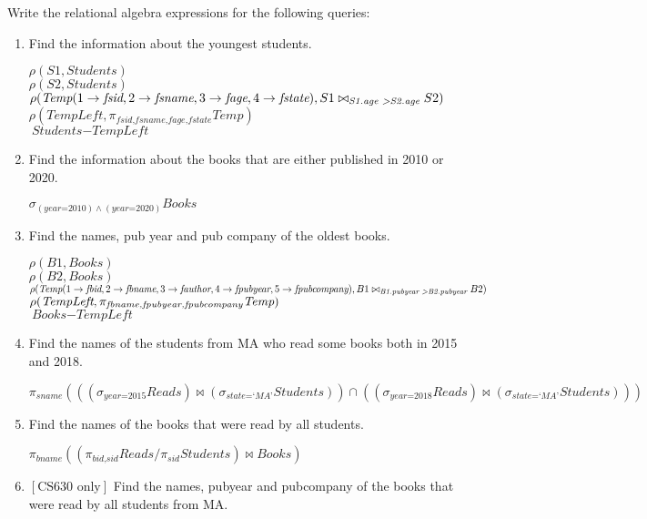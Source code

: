 \documentclass[letterpaper, 11pt]{article}
\begin{document}
Write the relational algebra expressions for the following queries:
\begin{enumerate}[label={\alph*})]
    \item Find the information about the youngest students.
    
    $\rho(S1, \textit{Students})$\\
    $\rho(S2, \textit{Students})$\\
    $\rho(\textit{Temp}(1 \to \textit{fsid}, 2 \to \textit{fsname}, 3 \to \textit{fage}, 4 \to \textit{fstate}), S1 \bowtie_{\textit{S1.age \textgreater S2.age}}S2)$\\
    $\rho(\textit{TempLeft}, \pi_{\textit{fsid,fsname,fage,fstate}}\textit{Temp})$\\
    $\textit{Students} - \textit{TempLeft}$
    
    \item Find the information about the books that are either published in 2010 or 2020.

    $\sigma_{(\textit{year=2010}) \wedge (\textit{year=2020})}\textit{Books}$
    
    \item Find the names, pub year and pub company of the oldest books.

    $\rho(B1, \textit{Books})$\\
    $\rho(B2, \textit{Books})$\\
    $\rho(\textit{Temp}(1 \to \textit{fbid}, 2 \to \textit{fbname}, 3 \to \textit{fauthor}, 4 \to \textit{fpubyear}, 5 \to \textit{fpubcompany}), B1 \bowtie_{\textit{B1.pubyear \textgreater B2.pubyear}} B2)$\\
    $\rho(\textit{TempLeft}, \pi_{\textit{fbname,fpubye\textit{}ar,fpubcompany}}\textit{Temp})$\\
    $\textit{Books} - \textit{TempLeft}$
    
    \item Find the names of the students from MA who read some books both in 2015 and 2018.

    $\pi_{\textit{sname}}(((\sigma_{\textit{year=2015}}\textit{Reads}) \bowtie (\sigma_{\textit{state=`MA'}}\textit{Students})) \cap ((\sigma_{\textit{year=2018}}\textit{Reads}) \bowtie (\sigma_{\textit{state=`MA'}}\textit{Students})))$
    
    \item Find the names of the books that were read by all students.

    $\pi_{\textit{bname}}((\pi_{\textit{bid,sid}}\textit{Reads} / \pi_{\textit{sid}}\textit{Students}) \bowtie \textit{Books})$
    
    \item $\left[\text{CS630 only}\right]$ Find the names, pubyear and pubcompany of the books that were read by all students from MA.
\end{enumerate}
\end{document}
